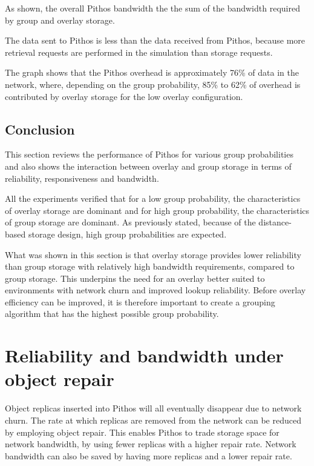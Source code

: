 As shown, the overall Pithos bandwidth the the sum of the bandwidth required by group and overlay storage.

The data sent to Pithos is less than the data received from Pithos, because more retrieval requests are performed in the simulation than storage requests.

The graph shows that the Pithos overhead is approximately 76\% of data in the network, where, depending on the group probability, 85\% to 62\% of overhead is contributed by overlay storage for the low overlay configuration.

\subsection{Conclusion}

This section reviews the performance of Pithos for various group probabilities and also shows the interaction between overlay and group storage in terms of reliability, responsiveness and bandwidth.

All the experiments verified that for a low group probability, the characteristics of overlay storage are dominant and for high group probability, the characteristics of group storage are dominant. As previously stated, because of the distance-based storage design, high group probabilities are expected.

What was shown in this section is that overlay storage provides lower reliability than group storage with relatively high bandwidth requirements, compared to group storage. This underpins the need for an overlay better suited to environments with network churn and improved lookup reliability. Before overlay efficiency can be improved, it is therefore important to create a grouping algorithm that has the highest possible group probability.

\section{Reliability and bandwidth under object repair}
\label{repair_results}

Object replicas inserted into Pithos will all eventually disappear due to network churn. The rate at which replicas are removed from the network can be reduced by employing object repair. This enables Pithos to trade storage space for network bandwidth, by using fewer replicas with a higher repair rate. Network bandwidth can also be saved by having more replicas and a lower repair rate.

